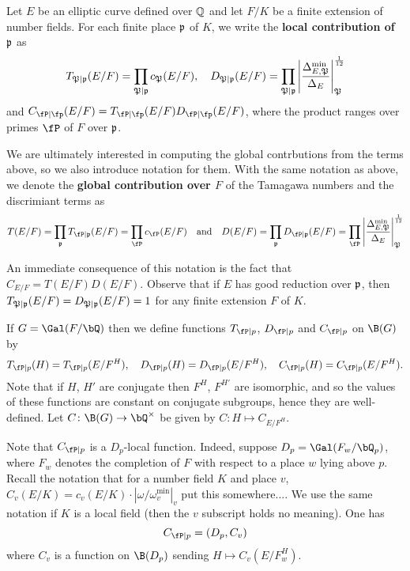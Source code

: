 \begin{notation}\label{not_contr}
    Let $E$ be an elliptic curve defined over $\mathbb{Q}$ and let $F/K$ be a finite extension of number fields. For each finite place $\mathfrak{p}$ of $K$, we write the \textbf{local contribution of $\mathfrak{p}$} as 
    $$T_{\mathfrak{P}\mid\mathfrak{p}}(E/F)=\prod_{\mathfrak{P}\mid\mathfrak{p}}c_\mathfrak{P}(E/F),\quad D_{\mathfrak{P}\mid\mathfrak{p}}(E/F)=\prod_{\mathfrak{P}\mid\mathfrak{p}}\left|\frac{\Delta_{E,\mathfrak{P}}^{\min}}{\Delta_E}\right|_\mathfrak{P}^{\frac{1}{12}}$$ 
    and $C_{\fP\mid\fp}(E/F)=T_{\fP\mid\fp}(E/F)D_{\fP\mid\fp}(E/F)$, where the product ranges over primes $\fP$ of $F$ over $\mathfrak{p}$. 

    We are ultimately interested in computing the global contrbutions from the terms above, so we also introduce notation for them. With the same notation as above, we denote the \textbf{global contribution over $F$} of the Tamagawa numbers and the discrimiant terms as 
    $$T(E/F)=\prod_\pp T_{\fP\mid\pp}(E/F)=\prod_\fP c_\fP(E/F)\quad\text{and}\quad D(E/F)=\prod_\pp D_{\fP\mid\pp}(E/F)=\prod_\fP \left|\frac{\Delta_{E,\mathfrak{P}}^{\min}}{\Delta_E}\right|_\mathfrak{P}^{\frac{1}{12}}$$ 

\end{notation}

An immediate consequence of this notation is the fact that $C_{E/F}=T(E/F)D(E/F)$.
Observe that if $E$ has good reduction over $\mathfrak{p}$, then $T_{\mathfrak{P}\mid\mathfrak{p}}(E/F)=D_{\mathfrak{P}\mid\mathfrak{p}}(E/F)=1$ for any finite extension $F$ of $K$. 

\begin{notation}\label{not_contr_fns}
    If $G = \Gal(F / \bQ)$ then we define functions $T_{\fP \mid p}$, $D_{\fP \mid p}$ and $C_{\fP \mid p}$ on $\B(G)$ by 
    \[ T_{\fP \mid p}(H) = T_{\fP \mid p}(E / F^H), \quad D_{\fP \mid p}(H) = D_{\fP \mid p}(E / F^H), \quad C_{\fP \mid p}(H) = C_{\fP \mid p}(E / F^H). \]
    Note that if $H$, $H'$ are conjugate then $F^H$, $F^{H'}$ are isomorphic, and so the values of these functions are constant on conjugate subgroups, hence they are well-defined. Let $C \colon \B(G) \to \bQ^{\times}$ be given by $C \colon H \mapsto C_{E / F^H}$.  
    
    Note that $C_{\fP \mid p}$ is a $D_p$-local function. Indeed, suppose $D_p = \Gal(F_w / \bQ_p)$, where $F_w$ denotes the completion of $F$ with respect to a place $w$ lying above $p$. Recall the notation that for a number field $K$ and place $v$, $C_v(E / K) = c_v(E / K) \cdot \left| \omega / \omega_v^{\min} \right|_v$ {\color{red} put this somewhere...}. We use the same notation if $K$ is a local field (then the $v$ subscript holds no meaning).
    One has
    \begin{equation*}
    C_{\fP \mid p} = (D_p, C_v)
    \end{equation*}
    where $C_v$ is a function on $\B(D_p)$ sending $H \mapsto C_v(E / F_w^H)$.

\end{notation}

